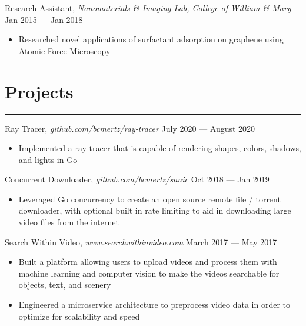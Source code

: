 \documentclass[12pt]{article}
\begin{document}
\noindent Research Assistant, \textit{Nanomaterials \& Imaging Lab, College of William \& Mary} \hfill Jan 2015 --- Jan 2018
\vspace{-0.1cm}
\begin{itemize}
  \itemsep-0.4em
	\item Researched novel applications of surfactant adsorption on graphene using Atomic Force Microscopy
\end{itemize}

\vspace{-0.50cm}
\section*{Projects}
\vspace{-0.2cm}
\hrule
\vspace{0.25cm}

\noindent Ray Tracer, \textit{github.com/bcmertz/ray-tracer} \hfill July 2020 --- August 2020
\vspace{-0.1cm}
\begin{itemize}
  \itemsep-0.4em
        \item Implemented a ray tracer that is capable of rendering shapes, colors, shadows, and lights in Go
\end{itemize}

\noindent Concurrent Downloader, \textit{github.com/bcmertz/sanic} \hfill Oct 2018 --- Jan 2019
\vspace{-0.1cm}
\begin{itemize}
  \itemsep-0.4em
        \item Leveraged Go concurrency to create an open source remote file / torrent downloader, with optional built in rate limiting to aid in downloading large video files from the internet
\end{itemize}


\noindent Search Within Video, \textit{www.searchwithinvideo.com} \hfill March 2017 --- May 2017
\vspace{-0.1cm}
\begin{itemize}
  \itemsep-0.4em
        \item Built a platform allowing users to upload videos and process them with machine learning and computer vision to make the videos searchable for objects, text, and scenery
	\item Engineered a microservice architecture to preprocess video data in order to optimize for scalability and speed
\end{itemize}
\end{document}
